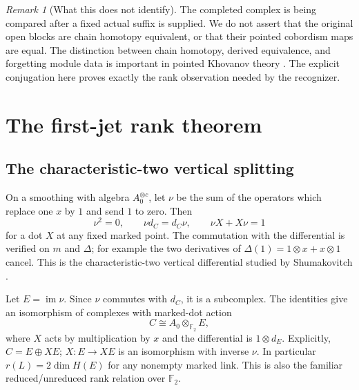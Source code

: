 \documentclass[11pt]{article}
\theoremstyle{definition}\newtheorem{definition}[theorem]{Definition}\newtheorem{example}[theorem]{Example}
\theoremstyle{remark}\newtheorem{remark}[theorem]{Remark}
\newcommand{\F}{{\mathbb{F}_2}}
\newcommand{\im}{\operatorname{im}}
\begin{document}
\begin{remark}[What this does not identify]
The completed complex is being compared after a fixed actual suffix is supplied. We do not assert that the original open blocks are chain homotopy equivalent, or that their pointed cobordism maps are equal. The distinction between chain homotopy, derived equivalence, and forgetting module data is important in pointed Khovanov theory \cite{Nahm}. The explicit conjugation here proves exactly the rank observation needed by the recognizer.
\end{remark}

\section{The first-jet rank theorem}
\subsection{The characteristic-two vertical splitting}\label{sec:vertical}
On a smoothing with algebra $A_0^{\otimes c}$, let $\nu$ be the sum of the operators which replace one $x$ by $1$ and send $1$ to zero. Then
\begin{equation}\label{eq:nu}
 \nu^2=0,\qquad \nu d_C=d_C\nu,\qquad \nu X+X\nu=1
\end{equation}
for a dot $X$ at any fixed marked point. The commutation with the differential is verified on $m$ and $\Delta$; for example the two derivatives of $\Delta(1)=1\otimes x+x\otimes1$ cancel. This is the characteristic-two vertical differential studied by Shumakovitch \cite{Shumakovitch}.

Let $E=\im\nu$. Since $\nu$ commutes with $d_C$, it is a subcomplex. The identities give an isomorphism of complexes with marked-dot action
\begin{equation}\label{eq:Asplit}
 C\cong A_0\otimes_\F E,
\end{equation}
where $X$ acts by multiplication by $x$ and the differential is $1\otimes d_E$. Explicitly, $C=E\oplus XE$; $X:E\to XE$ is an isomorphism with inverse $\nu$. In particular $r(L)=2\dim H(E)$ for any nonempty marked link. This is also the familiar reduced/unreduced rank relation over $\F$.
\end{document}
